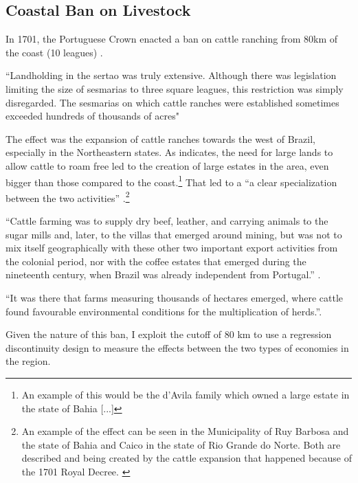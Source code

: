 \documentclass{article}
\begin{document}
\subsection{Coastal Ban on Livestock}

In 1701, the Portuguese Crown enacted a ban on cattle ranching from 80km of the coast (10 leagues) \parencites[p~.40]{Fausto2014-bh}[p~.198]{Simonsen2005-ps}[p~.460]{Bethell1984-of}.

\textcite{Bethell1984-of} ``Landholding in the sertao was truly extensive. Although there was legislation limiting the size of sesmarias to three square leagues, this restriction was simply disregarded. The sesmarias on which cattle ranches were established sometimes exceeded hundreds of thousands of acres"

The effect was the expansion of cattle ranches towards the west of Brazil, especially in the Northeastern states. 
As \textcite[p~.41]{Fausto2014-bh} indicates, the need for large lands to allow cattle to roam free led to the creation of large estates in the area, even bigger than those compared to the coast.\footnote{An example of this would be the d'Avila family which owned a large estate in the state of Bahia [...]}
That led to a ``a clear specialization between the two activities'' \parencite{Ribeiro2012-lb}.\footnote{An example of the effect can be seen in the Municipality of Ruy Barbosa and the state of Bahia and Caico in the state of Rio Grande do Norte. Both are described and being created by the cattle expansion that happened because of the 1701 Royal Decree. \parencite{UnknownUnknown-ro}}

\parencite[p~.]{Boxer1962-bj}

``Cattle farming was to supply dry beef, leather, and carrying animals to the sugar mills and, later, to the villas that emerged around mining, but was not to mix itself geographically with these other two important export activities from the colonial period, nor with the coffee estates that emerged during the nineteenth century,  when  Brazil was already independent from  Portugal.'' \parencite{Ribeiro2012-lb}.

``It was there that farms measuring thousands of hectares emerged, where cattle found favourable environmental conditions for the multiplication of herds.''\parencite{Ribeiro2012-lb}.


Given the nature of this ban, I exploit the cutoff of 80 km to use a regression discontinuity design to measure the effects between the two types of economies in the region. 
\end{document}
